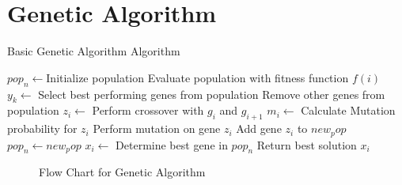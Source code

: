 \section{Genetic Algorithm}
\begin{algorithm}
\caption{Basic Genetic Algorithm Algorithm\cite{FamilyGA,AdaptiveSAGA,DistributedHierarchicalGA,SelfAdaptiveGA}}
\label{alg:GA}
	\begin{algorithmic}[1]
		\STATE $pop_n\leftarrow$Initialize population
		\STATE Evaluate population with fitness function $f(i)$
		\STATE $y_k \leftarrow$ Select best performing genes from population
		\STATE Remove other genes from population
		\REPEAT
				\STATE $z_i \leftarrow$ Perform crossover with $g_i$ and $g_{i+1}$
				\STATE $m_i\leftarrow$ Calculate Mutation probability for $z_i$
					\STATE Perform mutation on gene $z_i$
				\ENDIF
				\STATE Add gene $z_i$ to $new_pop$
			\ENDFOR
		\STATE $pop_n \leftarrow new_pop$
		\ENDWHILE
		\STATE $x_i \leftarrow$ Determine best gene in $pop_n$
		\STATE Return best solution $x_i$
	\end{algorithmic}
\end{algorithm}
\label{sec:geneticalgorithm}
\begin{figure}[htbp!]
	\begin{center}
	\caption{Flow Chart for Genetic Algorithm}
	\label{fig:GeneticAlgorithmFlowChart}
	\end{center}
\end{figure}
